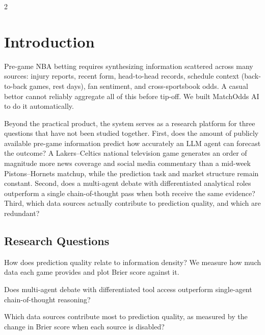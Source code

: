 \documentclass[11pt]{article}
\begin{document}
\vspace{1em}
\begin{multicols}{2}

\section{Introduction}

Pre-game NBA betting requires synthesizing information scattered across many sources: injury reports, recent form, head-to-head records, schedule context (back-to-back games, rest days), fan sentiment, and cross-sportsbook odds. A casual bettor cannot reliably aggregate all of this before tip-off. We built MatchOdds AI to do it automatically.

Beyond the practical product, the system serves as a research platform for three questions that have not been studied together. First, does the amount of publicly available pre-game information predict how accurately an LLM agent can forecast the outcome? A Lakers--Celtics national television game generates an order of magnitude more news coverage and social media commentary than a mid-week Pistons--Hornets matchup, while the prediction task and market structure remain constant. Second, does a multi-agent debate with differentiated analytical roles \citep{du2024} outperform a single chain-of-thought pass \citep{wei2022} when both receive the same evidence? Third, which data sources actually contribute to prediction quality, and which are redundant?

\subsection{Research Questions}

\begin{description}[leftmargin=0pt]
    \item[RQ1] How does prediction quality relate to information density? We measure how much data each game provides and plot Brier score against it.
    \item[RQ2] Does multi-agent debate with differentiated tool access outperform single-agent chain-of-thought reasoning?
    \item[RQ3] Which data sources contribute most to prediction quality, as measured by the change in Brier score when each source is disabled?
\end{description}


\end{multicols}
\end{document}
